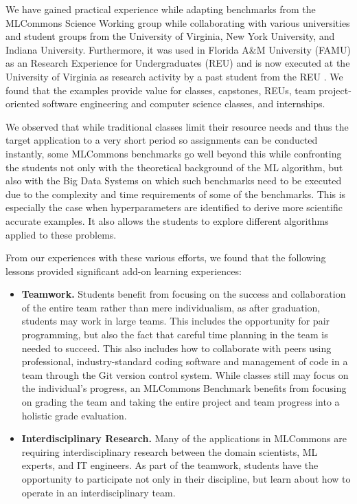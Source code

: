 \documentclass[utf8]{FrontiersinVancouver} %
\begin{document}
{We have gained practical experience while adapting benchmarks from the
MLCommons Science Working group while collaborating with various
universities and student groups from the University of Virginia, New
York University, and Indiana University. Furthermore, it was used in
Florida A\&M University (FAMU) as an Research Experience for
Undergraduates (REU) and is now executed at the University of Virginia
as research activity by a past student from the REU
\cite{las-2022-mdpi-crypto}. We found that the examples provide value
for classes, capstones, REUs, team project-oriented software
engineering and computer science classes, and internships.

We observed that while traditional classes limit their resource needs
and thus the target application to a very short period so assignments
can be conducted instantly, some MLCommons benchmarks go well beyond
this while confronting the students not only with the theoretical
background of the ML algorithm, but also with the Big Data Systems on
which such benchmarks need to be executed due to the complexity and
time requirements of some of the benchmarks. This is especially the
case when hyperparameters are identified to derive more scientific
accurate examples. It also allows the students to explore different
algorithms applied to these problems.

From our experiences with these various efforts, we found that the
following lessons provided significant add-on learning experiences:

\begin{itemize}


\item {\bf Teamwork.} Students benefit from focusing on the success
  and collaboration of the entire team rather than mere individualism,
  as after graduation, students may work in large teams. This includes
  the opportunity for pair programming, but also the fact that careful
  time planning in the team is needed to succeed. This also includes
  how to collaborate with peers using professional, industry-standard
  coding software and management of code in a team through the Git
  version control system. While classes still may focus on the
  individual's progress, an MLCommons Benchmark benefits from focusing
  on grading the team and taking the entire project and team progress
  into a holistic grade evaluation.

  \item {\bf Interdisciplinary Research.} Many of the applications in
    MLCommons are requiring interdisciplinary research between the domain
    scientists, ML experts, and IT engineers. As part of the teamwork,
    students have the opportunity to participate not only in their
    discipline, but learn about how to operate in an interdisciplinary
    team.


\end{itemize}}
\end{document}
